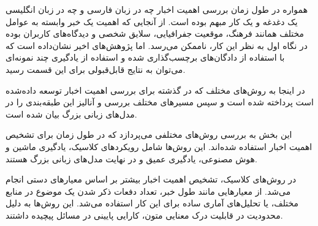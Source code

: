 
همواره در طول زمان بررسی اهمیت اخبار چه در زبان فارسی و چه در زبان انگلیسی یک دغدغه و یک کار مبهم بوده است. از آنجایی که اهمیت یک خبر وابسته به عوامل مختلف همانند فرهنگ، موقعیت جفرافیایی، سلایق شخصی و دیدگاه‌های کاربران بوده در نگاه اول به نظر این کار، ناممکن می‌رسد. اما پژوهش‌های اخیر نشان‌داده است که با استفاده از دادگان‌های برچسب‌گذاری شده و استفاده از یادگیری چند نمونه‌ای می‌توان به نتایج قابل‌قبولی برای این قسمت رسید.

در اینجا به روش‌های مختلف که در گذشته برای بررسی اهمیت اخبار توسعه‌ داده‌شده است پرداخته شده است و سپس مسیر‌های مختلف بررسی و آنالیز این طبقه‌بندی را در مدل‌های زبانی‌ بزرگ بیان شده است.

این بخش به بررسی روش‌های مختلفی می‌پردازد که در طول زمان برای تشخیص اهمیت اخبار استفاده شده‌اند. این روش‌ها شامل رویکردهای کلاسیک، یادگیری ماشین و هوش مصنوعی، یادگیری عمیق و در نهایت مدل‌های زبانی بزرگ هستند.

در روش‌های کلاسیک، تشخیص اهمیت اخبار بیشتر بر اساس معیارهای دستی انجام می‌شد. از معیارهایی مانند طول خبر، تعداد دفعات ذکر شدن یک موضوع در منابع مختلف، یا تحلیل‌های آماری ساده برای این کار استفاده می‌شد.
این روش‌ها به دلیل محدودیت در قابلیت درک معنایی متون، کارایی پایینی در مسائل پیچیده داشتند.